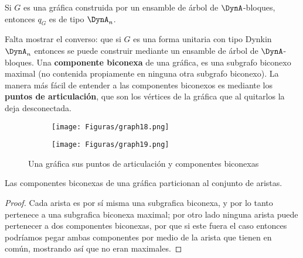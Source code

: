 \begin{lemma}
Si $G$ es una gráfica construida por un ensamble de árbol de $\DynA$-bloques, entonces $q_{G}$ es de tipo $\DynA_{n}$.
\label{lemma:2.10}
\end{lemma}

Falta mostrar el converso: que si $G$ es una forma unitaria con tipo Dynkin $\DynA_{n}$ entonces se puede construir mediante un ensamble de árbol de $\DynA$-bloques. Una \textbf{componente biconexa} de una gráfica, es una subgrafo biconexo maximal (no contenida propiamente en ninguna otra subgrafo biconexo). La manera más fácil de entender a las componentes biconexos es mediante los \textbf{puntos de articulación}, que son los vértices de la gráfica que al quitarlos la deja desconectada.\\

\begin{figure}[h]
    \begin{subfigure}[b]{0.5\textwidth}
      \begin{minipage}{7cm}
	\centering%
	    \texttt{[image: Figuras/graph18.png]}
	 \end{minipage}
	\caption{}
     \end{subfigure}
     \begin{subfigure}[b]{0.5\textwidth}
        \begin{minipage}{7cm}
       	 \centering%
	    \texttt{[image: Figuras/graph19.png]}
        \end{minipage}
        \caption{}
     \end{subfigure}
     \caption{Una gráfica sus puntos de articulación y componentes biconexas}
    \label{figura:2.9}
\end{figure}

\begin{lemma}
Las componentes biconexas de una gráfica particionan al conjunto de aristas.
\label{lemma:2.11}
\end{lemma}

\begin{proof}
Cada arista es por sí misma una subgrafica biconexa, y por lo tanto pertenece a una subgrafica biconexa maximal; por otro lado ninguna arista puede pertenecer a dos componentes biconexas, por que si este fuera el caso entonces podríamos pegar ambas componentes por medio de la arista que tienen en común, mostrando así que no eran maximales.
\end{proof}

